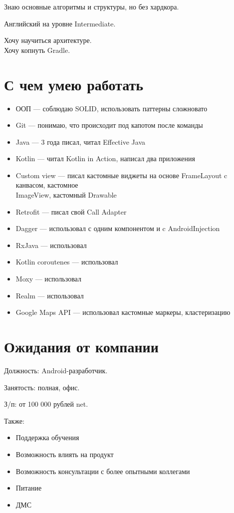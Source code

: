 \documentclass[a4paper,12pt]{article}
\begin{document}
    Знаю основные алгоритмы и структуры, но без хардкора.

    Английский на уровне Intermediate.

    Хочу научиться архитектуре.\\
    Хочу копнуть Gradle.

    \section*{С чем умею работать}%

    \begin{itemize}
        \item ООП --- соблюдаю SOLID, использовать паттерны сложновато
        \item Git --- понимаю, что происходит под капотом после команды
        \item Java --- 3 года писал, читал Effective Java
        \item Kotlin --- читал Kotlin in Action, написал два приложения
        \item Custom view --- писал кастомные виджеты на основе FrameLayout c канвасом, кастомное\\ ImageView, кастомный Drawable
        \item Retrofit --- писал свой Call Adapter
        \item Dagger --- использовал с одним компонентом и c AndroidInjection
        \item RxJava --- использовал
        \item Kotlin coroutenes --- использовал
        \item Moxy --- использовал
        \item Realm --- использовал
        \item Google Maps API --- использовал кастомные маркеры, кластеризацию
    \end{itemize}

    \section*{Ожидания от компании}

    Должность: Android-разработчик.\par
    Занятость: полная, офис.\par
    З/п: от 100 000 рублей net.\par
    Также:
    \begin{itemize}
        \item Поддержка обучения
        \item Возможность влиять на продукт
        \item Возможность консультации с более опытными коллегами
        \item Питание
        \item ДМС
    \end{itemize}
\end{document}

